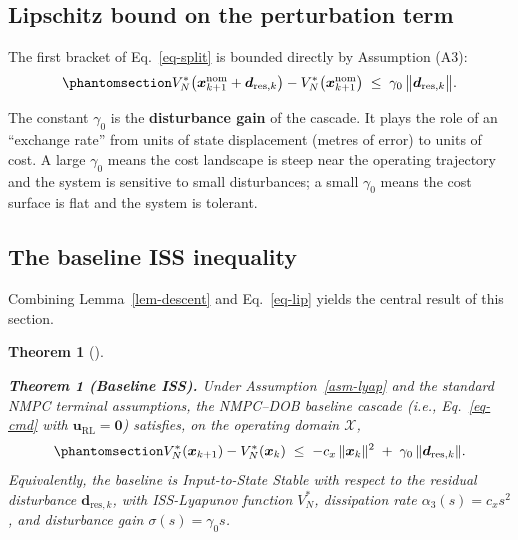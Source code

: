 \documentclass[
  11pt,
]{article}
\theoremstyle{plain}
\theoremstyle{plain}
\newtheorem{theorem}{Theorem}[section]
\theoremstyle{definition}
\theoremstyle{remark}
\begin{document}
\subsection{Lipschitz bound on the perturbation
term}\label{lipschitz-bound-on-the-perturbation-term}

The first bracket of Eq.~\ref{eq-split} is bounded directly by
Assumption (A3): \begin{equation}\protect\phantomsection\label{eq-lip}{
V_N^*\bigl(\bm{x}_{k+1}^{\mathrm{nom}} + \bm{d}_{\mathrm{res},k}\bigr)
- V_N^*\bigl(\bm{x}_{k+1}^{\mathrm{nom}}\bigr)
\;\le\; \gamma_0\,\bigl\|\bm{d}_{\mathrm{res},k}\bigr\|.
}\end{equation}

The constant \(\gamma_0\) is the \textbf{disturbance gain} of the
cascade. It plays the role of an ``exchange rate'' from units of state
displacement (metres of error) to units of cost. A large \(\gamma_0\)
means the cost landscape is steep near the operating trajectory and the
system is sensitive to small disturbances; a small \(\gamma_0\) means
the cost surface is flat and the system is tolerant.

\subsection{The baseline ISS
inequality}\label{the-baseline-iss-inequality}

Combining Lemma~\ref{lem-descent} and Eq.~\ref{eq-lip} yields the
central result of this section.

\begin{theorem}[]\protect\hypertarget{thm-baseline-iss}{}\label{thm-baseline-iss}

\textbf{Theorem 1 (Baseline ISS).} Under Assumption~\ref{asm-lyap} and
the standard NMPC terminal assumptions, the NMPC--DOB baseline cascade
(i.e., Eq.~\ref{eq-cmd} with \(\bm{u}_{\mathrm{RL}}=\bm{0}\)) satisfies,
on the operating domain \(\mathcal{X}\),
\begin{equation}\protect\phantomsection\label{eq-iss}{
V_N^*(\bm{x}_{k+1}) - V_N^*(\bm{x}_k)
\;\le\;
-c_x\,\|\bm{x}_k\|^2
\;+\; \gamma_0\,\|\bm{d}_{\mathrm{res},k}\|.
}\end{equation} Equivalently, the baseline is \emph{Input-to-State
Stable} with respect to the residual disturbance
\(\bm{d}_{\mathrm{res},k}\), with ISS-Lyapunov function \(V_N^*\),
dissipation rate \(\alpha_3(s)=c_x s^2\), and disturbance gain
\(\sigma(s)=\gamma_0 s\).

\end{theorem}
\end{document}
